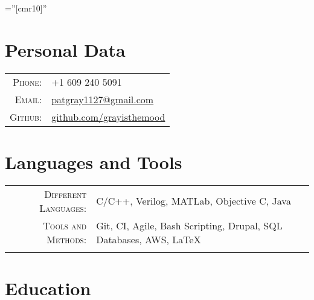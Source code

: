 \documentclass[a4paper,10pt, onepage]{article} %
\begin{document}
\pagestyle{empty} 
\font\fb=''[cmr10]'' %

\par{\par} %
\par{\par}

\section{Personal Data}
\begin{tabular}{rp{10cm}}
\textsc{Phone:} & +1 609 240 5091 \\
\textsc{Email:} & \href{mailto:patgray1127@gmail.com}{patgray1127@gmail.com}\\
\textsc{Github:} & \href{http://github.com/grayisthemood}{github.com/grayisthemood}\\
\end{tabular}



\section{Languages and Tools}

\begin{tabular}{rp{10cm}}
\textsc{Different Languages:} & C/C++, Verilog, MATLab, Objective C, Java\\
\textsc{Tools and Methods:} & Git, CI, Agile, Bash Scripting, Drupal, SQL Databases, AWS, \LaTeX\\
\multicolumn{2}{c}{}\\
\end{tabular}


\section{Education}
\end{document}
